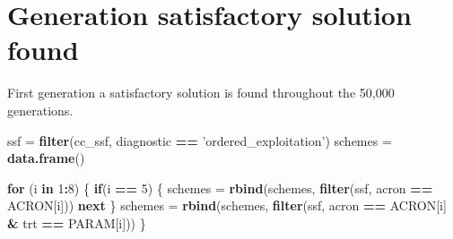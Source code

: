 \documentclass[]{book}
\newenvironment{Shaded}{\begin{snugshade}}{\end{snugshade}}
\newcommand{\ControlFlowTok}[1]{\textcolor[rgb]{0.13,0.29,0.53}{\textbf{#1}}}
\newcommand{\DecValTok}[1]{\textcolor[rgb]{0.00,0.00,0.81}{#1}}
\newcommand{\KeywordTok}[1]{\textcolor[rgb]{0.13,0.29,0.53}{\textbf{#1}}}
\newcommand{\NormalTok}[1]{#1}
\newcommand{\OperatorTok}[1]{\textcolor[rgb]{0.81,0.36,0.00}{\textbf{#1}}}
\newcommand{\StringTok}[1]{\textcolor[rgb]{0.31,0.60,0.02}{#1}}
\begin{document}
\hypertarget{generation-satisfactory-solution-found-1}{%
\section{Generation satisfactory solution found}\label{generation-satisfactory-solution-found-1}}

First generation a satisfactory solution is found throughout the 50,000 generations.

\begin{Shaded}
\begin{Highlighting}[]
\NormalTok{ssf =}\StringTok{ }\KeywordTok{filter}\NormalTok{(cc_ssf, diagnostic }\OperatorTok{==}\StringTok{ 'ordered_exploitation'}\NormalTok{)}
\NormalTok{schemes =}\StringTok{ }\KeywordTok{data.frame}\NormalTok{()}

\ControlFlowTok{for}\NormalTok{ (i }\ControlFlowTok{in} \DecValTok{1}\OperatorTok{:}\DecValTok{8}\NormalTok{) \{}
  \ControlFlowTok{if}\NormalTok{(i }\OperatorTok{==}\StringTok{ }\DecValTok{5}\NormalTok{)}
\NormalTok{  \{}
\NormalTok{    schemes =}\StringTok{ }\KeywordTok{rbind}\NormalTok{(schemes, }\KeywordTok{filter}\NormalTok{(ssf, acron }\OperatorTok{==}\StringTok{ }\NormalTok{ACRON[i]))}
    \ControlFlowTok{next}
\NormalTok{  \}}
\NormalTok{  schemes =}\StringTok{ }\KeywordTok{rbind}\NormalTok{(schemes, }\KeywordTok{filter}\NormalTok{(ssf, acron }\OperatorTok{==}\StringTok{ }\NormalTok{ACRON[i] }\OperatorTok{&}\StringTok{ }\NormalTok{trt }\OperatorTok{==}\StringTok{ }\NormalTok{PARAM[i]))}
\NormalTok{\}}


\end{Highlighting}
\end{Shaded}
\end{document}

